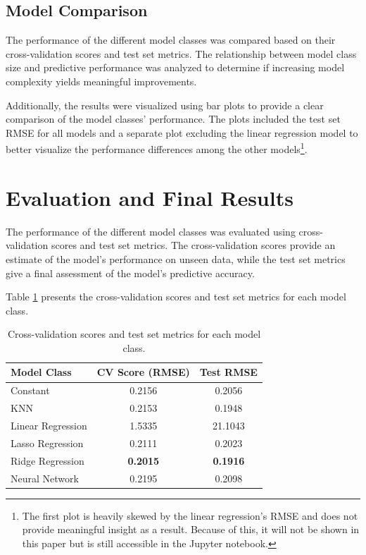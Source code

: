 \documentclass{article}
\begin{document}
\subsection{Model Comparison}
The performance of the different model classes was compared based on their cross-validation scores and test set metrics. The relationship between model class size and predictive performance was analyzed to determine if increasing model complexity yields meaningful improvements.

Additionally, the results were visualized using bar plots to provide a clear comparison of the model classes' performance. The plots included the test set RMSE for all models and a separate plot excluding the linear regression model to better visualize the performance differences among the other models\footnote{The first plot is heavily skewed by the linear regression's RMSE and does not provide meaningful insight as a result. Because of this, it will not be shown in this paper but is still accessible in the Jupyter notebook.}.


\section{Evaluation and Final Results}

The performance of the different model classes was evaluated using cross-validation scores and test set metrics. The cross-validation scores provide an estimate of the model's performance on unseen data, while the test set metrics give a final assessment of the model's predictive accuracy.

Table \ref{tab:results} presents the cross-validation scores and test set metrics for each model class.

\begin{table}[ht]
\centering
\begin{tabular}{|l|c|c|}
\hline
\textbf{Model Class} & \textbf{CV Score (RMSE)} & \textbf{Test RMSE} \\
\hline
Constant & 0.2156 & 0.2056 \\
KNN & 0.2153 & 0.1948 \\
Linear Regression & 1.5335 & 21.1043 \\
Lasso Regression & 0.2111 & 0.2023 \\
Ridge Regression & \textbf{0.2015} & \textbf{0.1916} \\
Neural Network & 0.2195 & 0.2098 \\
\hline
\end{tabular}
\caption{Cross-validation scores and test set metrics for each model class.}
\label{tab:results}
\end{table}
\end{document}
